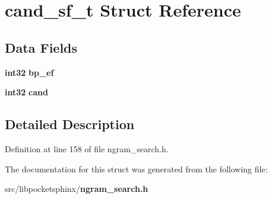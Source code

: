 \section{cand\-\_\-sf\-\_\-t \-Struct \-Reference}
\label{structcand__sf__t}
\subsection*{\-Data \-Fields}
\begin{DoxyCompactItemize}
\item 
{\bf int32} {\bfseries bp\-\_\-ef}\label{structcand__sf__t_ab04890bd8e455c234bf78aec9dab8803}

\item 
{\bf int32} {\bfseries cand}\label{structcand__sf__t_a7fcc5ff33fe4ad1a57d1acc272a29f36}

\end{DoxyCompactItemize}


\subsection{\-Detailed \-Description}


\-Definition at line 158 of file ngram\-\_\-search.\-h.



\-The documentation for this struct was generated from the following file\-:\begin{DoxyCompactItemize}
\item 
src/libpocketsphinx/{\bf ngram\-\_\-search.\-h}\end{DoxyCompactItemize}
